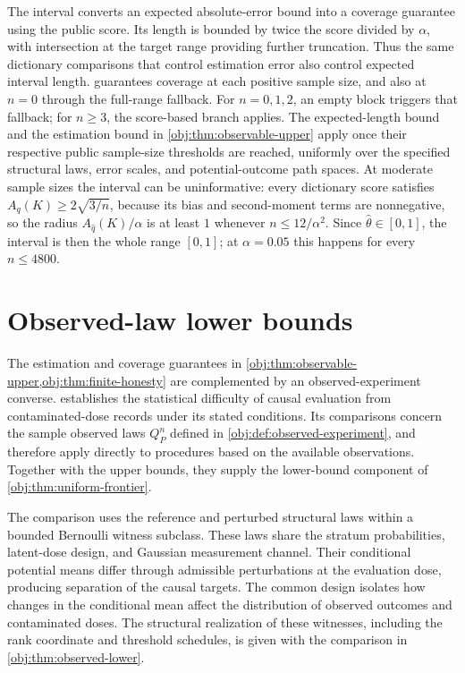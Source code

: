 \documentclass[11pt]{article}
\begin{document}
The interval converts an expected absolute-error bound into a coverage guarantee using the public score. Its length is bounded by twice the score divided by \(\alpha\), with intersection at the target range providing further truncation. Thus the same dictionary comparisons that control estimation error also control expected interval length.  guarantees coverage at each positive sample size, and also at \(n=0\) through the full-range fallback. For \(n=0,1,2\), an empty block triggers that fallback; for \(n\ge3\), the score-based branch applies. The expected-length bound and the estimation bound in \cref{obj:thm:observable-upper} apply once their respective public sample-size thresholds are reached, uniformly over the specified structural laws, error scales, and potential-outcome path spaces. At moderate sample sizes the interval can be uninformative: every dictionary score satisfies \(A_q(K)\ge2\sqrt{3/n}\), because its bias and second-moment terms are nonnegative, so the radius \(A_{\widehat q}(K)/\alpha\) is at least \(1\) whenever \(n\le12/\alpha^2\). Since \(\widehat\theta\in[0,1]\), the interval is then the whole range \([0,1]\); at \(\alpha=0.05\) this happens for every \(n\le4800\).


\section{Observed-law lower bounds}

The estimation and coverage guarantees in \cref{obj:thm:observable-upper,obj:thm:finite-honesty} are complemented by an observed-experiment converse.  establishes the statistical difficulty of causal evaluation from contaminated-dose records under its stated conditions. Its comparisons concern the sample observed laws \(Q_P^n\) defined in \cref{obj:def:observed-experiment}, and therefore apply directly to procedures based on the available observations. Together with the upper bounds, they supply the lower-bound component of \cref{obj:thm:uniform-frontier}.

The comparison uses the reference and perturbed structural laws  within a bounded Bernoulli witness subclass. These laws share the stratum probabilities, latent-dose design, and Gaussian measurement channel. Their conditional potential means differ through admissible perturbations at the evaluation dose, producing separation of the causal targets. The common design isolates how changes in the conditional mean affect the distribution of observed outcomes and contaminated doses. The structural realization of these witnesses, including the rank coordinate and threshold schedules, is given with the comparison in \cref{obj:thm:observed-lower}.
\end{document}
